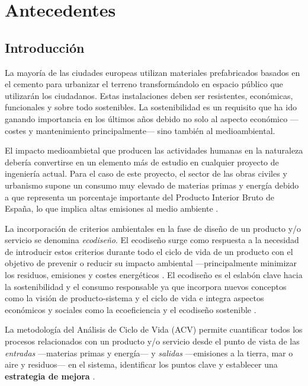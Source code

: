 \chapter{Antecedentes}\label{cap:antecedentes}

\section{Introducción}\label{sec:introantecedentes}
La mayoría de las ciudades europeas utilizan materiales prefabricados basados en el cemento para urbanizar el terreno transformándolo en espacio público que utilizarán los ciudadanos. Estas instalaciones deben ser resistentes, económicas, funcionales y sobre todo sostenibles. La sostenibilidad es un requisito que ha ido ganando importancia en los últimos años debido no solo al aspecto económico —costes y mantenimiento principalmente— sino también al medioambiental.

El impacto medioambietal que producen las actividades humanas en la naturaleza debería convertirse en un elemento más de estudio en cualquier proyecto de ingeniería actual. Para el caso de este proyecto, el sector de las obras civiles y urbanismo supone un consumo muy elevado de materias primas y energía debido a que representa un porcentaje importante del Producto Interior Bruto de España, lo que implica altas emisiones al medio ambiente \cite{minetur}.

La incorporación de criterios ambientales en la fase de diseño de un producto y/o servicio se denomina \textit{ecodiseño}. El ecodiseño surge como respuesta a la necesidad de introducir estos criterios durante todo el ciclo de vida de un producto con el objetivo de prevenir o reducir su impacto ambiental —principalmente minimizar los residuos, emisiones y costes energéticos \cite{iso14006}. El ecodiseño es el eslabón clave hacia la sostenibilidad y el consumo responsable ya que incorpora nuevos conceptos como la visión de producto-sistema y el ciclo de vida e integra aspectos económicos y sociales como la ecoeficiencia y el ecodiseño sostenible \cite{ihobeeco}.

La metodología del Análisis de Ciclo de Vida (ACV) permite cuantificar todos los procesos relacionados con un producto y/o servicio desde el punto de vista de las \textit{entradas} —materias primas y energía— y \textit{salidas} —emisiones a la tierra, mar o aire y residuos— en el sistema, identificar los puntos clave y establecer una \textbf{estrategia de mejora} \cite{iso14040}.

